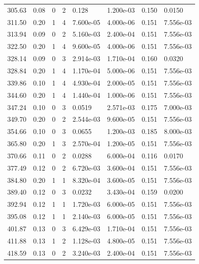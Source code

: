 \documentclass[preview]{standalone}
\begin{document}
{{{\begin{tabular}{L{1.2cm}C{1.2cm} C{0.3cm}C{0.5cm} C{1.4cm}C{1.4cm} C{1.4cm}C{1.4cm}}
  305.63  &  0.08  & 0     &  2 &  0.128  & 1.200e-03  & 0.150 &  0.0150   \\ 
  311.50  &  0.20  & 1     &  4 &  7.600e-05  & 4.000e-06  & 0.151 &  7.556e-03   \\ 
  313.94  &  0.09  & 0     &  2 &  5.160e-03  & 2.400e-04  & 0.151 &  7.556e-03   \\ 
  322.50  &  0.20  & 1     &  4 &  9.600e-05  & 4.000e-06  & 0.151 &  7.556e-03   \\ 
  328.14  &  0.09  & 0     &  3 &  2.914e-03  & 1.710e-04  & 0.160 &  0.0320   \\ 
  328.84  &  0.20  & 1     &  4 &  1.170e-04  & 5.000e-06  & 0.151 &  7.556e-03   \\ 
  339.86  &  0.10  & 1     &  4 &  4.930e-04  & 2.000e-05  & 0.151 &  7.556e-03   \\ 
  344.60  &  0.20  & 1     &  4 &  1.440e-04  & 1.000e-06  & 0.151 &  7.556e-03   \\ 
  347.24  &  0.10  & 0     &  3 &  0.0519  & 2.571e-03  & 0.175 &  7.000e-03   \\ 
  349.70  &  0.20  & 0     &  2 &  2.544e-03  & 9.600e-05  & 0.151 &  7.556e-03   \\ 
  354.66  &  0.10  & 0     &  3 &  0.0655  & 1.200e-03  & 0.185 &  8.000e-03   \\ 
  365.80  &  0.20  & 1     &  3 &  2.570e-04  & 1.200e-05  & 0.151 &  7.556e-03   \\ 
  370.66  &  0.11  & 0     &  2 &  0.0288  & 6.000e-04  & 0.116 &  0.0170   \\ 
  377.49  &  0.12  & 0     &  2 &  6.720e-03  & 3.600e-04  & 0.151 &  7.556e-03   \\ 
  384.80  &  0.20  & 1     &  1 &  8.320e-04  & 3.600e-05  & 0.151 &  7.556e-03   \\ 
  389.40  &  0.12  & 0     &  3 &  0.0232  & 3.430e-04  & 0.159 &  0.0200   \\ 
  392.94  &  0.12  & 1     &  1 &  1.720e-03  & 6.000e-05  & 0.151 &  7.556e-03   \\ 
  395.08  &  0.12  & 1     &  1 &  2.140e-03  & 6.000e-05  & 0.151 &  7.556e-03   \\ 
  401.87  &  0.13  & 0     &  3 &  6.429e-03  & 1.710e-04  & 0.151 &  7.556e-03   \\ 
  411.88  &  0.13  & 1     &  2 &  1.128e-03  & 4.800e-05  & 0.151 &  7.556e-03   \\ 
  418.59  &  0.13  & 0     &  2 &  3.240e-03  & 2.400e-04  & 0.151 &  7.556e-03   \\ 

\end{tabular}}}}
\end{document}
